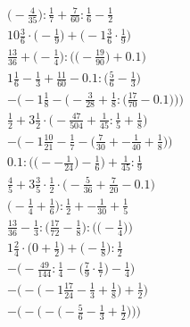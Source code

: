 \documentclass[8pt]{article}
\begin{document}
\begin{align}
\big(-\frac{4}{35}\big) : \frac{1}{7} + \frac{7}{60} : \frac{1}{6} - \frac{1}{2} \\
10\frac{3}{6} \cdot \big(-\frac{1}{9}\big) + \big(-1\frac{3}{6} \cdot \frac{1}{9}\big) \\
\frac{13}{36} + \Big(-\frac{1}{4}\Big) : \Big(\big(-\frac{19}{90}\big) + 0.1\Big) \\
1\frac{1}{6} - \frac{1}{3} + \frac{11}{60} - 0.1 : \big(\frac{5}{6} - \frac{1}{3}\big) \\
-\bigg(-1\frac{1}{8} - \Big(-\frac{3}{28} + \frac{1}{8} : \big(\frac{17}{70} - 0.1\big)\Big)\bigg) \\
\frac{1}{2} + 3\frac{1}{2} \cdot \big(-\frac{47}{504} + \frac{1}{45} : \frac{1}{5} + \frac{1}{8}\big) \\
-\Big(-1\frac{10}{21} - \frac{1}{7} - \big(\frac{7}{30} + -\frac{1}{40} + \frac{1}{8}\big)\Big) \\
0.1 : \Big(\big(--\frac{1}{24}\big) - \frac{1}{6}\Big) + \frac{1}{45} : \frac{1}{9} \\
\frac{4}{5} + 3\frac{3}{5} \cdot \frac{1}{2} \cdot \big(-\frac{5}{36} + \frac{7}{20} - 0.1\big) \\
\big(-\frac{1}{4} + \frac{1}{6}\big) : \frac{1}{2} + -\frac{1}{30} + \frac{1}{5} \\
\frac{13}{36} - \frac{1}{3} : \Big(\frac{17}{72} - \frac{1}{8}\Big) : \Big(\big(-\frac{1}{4}\big)\Big) \\
1\frac{2}{4} \cdot \big(0 + \frac{1}{2}\big) + \big(-\frac{1}{8}\big) : \frac{1}{2} \\
-\Big(-\frac{49}{144} : \frac{1}{4} - \big(\frac{7}{9} \cdot \frac{1}{7}\big) - \frac{1}{4}\Big) \\
-\Big(-\big(-1\frac{17}{24} - \frac{1}{3} + \frac{1}{8}\big) + \frac{1}{2}\Big) \\
-\bigg(-\Big(-\big(-\frac{5}{6} - \frac{1}{3} + \frac{1}{2}\big)\Big)\bigg)
\end{align}
\end{document}
